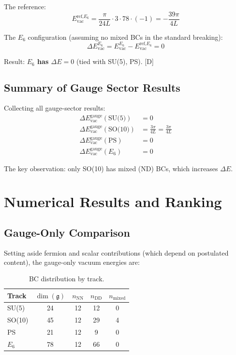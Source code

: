 \documentclass[11pt,a4paper]{article}
\newcommand{\tagD}{\textcolor{blue!70!black}{[D]}}
\begin{document}
The reference:
\begin{equation}
\label{eq:e6-ref}
E_{\text{vac}}^{\text{ref,}E_6} = \frac{\pi}{24L} \cdot 3 \cdot 78 \cdot (-1) = -\frac{39\pi}{4L}
\end{equation}

The $E_6$ configuration (assuming no mixed BCs in the standard breaking):
\begin{equation}
\label{eq:e6-delta}
\Delta E_{\text{vac}}^{E_6} = E_{\text{vac}}^{E_6} - E_{\text{vac}}^{\text{ref,}E_6} = 0
\end{equation}

Result: \textbf{$E_6$ has $\Delta E = 0$} (tied with SU(5), PS). \tagD

\subsection{Summary of Gauge Sector Results}

Collecting all gauge-sector results:
\begin{align}
\label{eq:summary-su5}
\Delta E_{\text{vac}}^{\text{gauge}}(\text{SU(5)}) &= 0 \\
\label{eq:summary-so10}
\Delta E_{\text{vac}}^{\text{gauge}}(\text{SO(10)}) &= \frac{3\pi}{4L} = \frac{3\pi}{4L} \\
\label{eq:summary-ps}
\Delta E_{\text{vac}}^{\text{gauge}}(\text{PS}) &= 0 \\
\label{eq:summary-e6}
\Delta E_{\text{vac}}^{\text{gauge}}(E_6) &= 0
\end{align}

The key observation: only SO(10) has mixed (ND) BCs, which increases $\Delta E$.

\section{Numerical Results and Ranking}

\subsection{Gauge-Only Comparison}

Setting aside fermion and scalar contributions (which depend on postulated content),
the gauge-only vacuum energies are:

\begin{table}[h]
\centering
\begin{tabular}{lcccc}
\toprule
Track & $\dim(\mathfrak{g})$ & $n_{\text{NN}}$ & $n_{\text{DD}}$ & $n_{\text{mixed}}$ \\
\midrule
SU(5) & 24 & 12 & 12 & 0 \\
SO(10) & 45 & 12 & 29 & 4 \\
PS & 21 & 12 & 9 & 0 \\
$E_6$ & 78 & 12 & 66 & 0 \\
\bottomrule
\end{tabular}
\caption{BC distribution by track.}
\label{tab:bc-dist}
\end{table}
\end{document}
